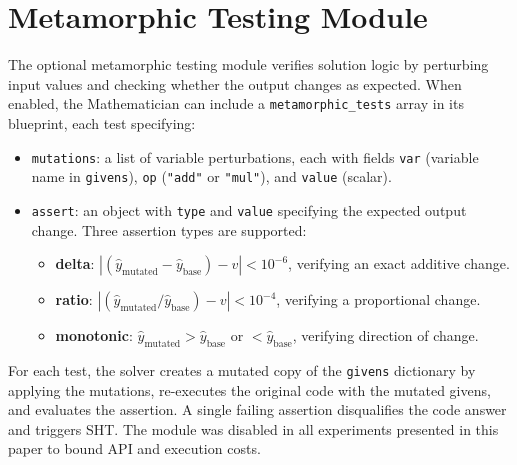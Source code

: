 \documentclass[11pt,a4paper]{article}
\begin{document}
\section{Metamorphic Testing Module}
\label{app:metamorphic}
The optional metamorphic testing module verifies solution logic by perturbing input values and checking whether the output changes as expected.
When enabled, the Mathematician can include a \texttt{metamorphic\_tests} array in its blueprint, each test specifying:
\begin{itemize}[leftmargin=*,itemsep=2pt]
    \item \texttt{mutations}: a list of variable perturbations, each with fields \texttt{var} (variable name in \texttt{givens}), \texttt{op} (\texttt{"add"} or \texttt{"mul"}), and \texttt{value} (scalar).
    \item \texttt{assert}: an object with \texttt{type} and \texttt{value} specifying the expected output change.
    Three assertion types are supported:
    \begin{itemize}[leftmargin=2em,itemsep=0pt]
        \item \textbf{delta}: $|(\hat{y}_\text{mutated} - \hat{y}_\text{base}) - v| < 10^{-6}$, verifying an exact additive change.
        \item \textbf{ratio}: $|(\hat{y}_\text{mutated} / \hat{y}_\text{base}) - v| < 10^{-4}$, verifying a proportional change.
        \item \textbf{monotonic}: $\hat{y}_\text{mutated} > \hat{y}_\text{base}$ or $< \hat{y}_\text{base}$, verifying direction of change.
    \end{itemize}
\end{itemize}
For each test, the solver creates a mutated copy of the \texttt{givens} dictionary by applying the mutations, re-executes the original code with the mutated givens, and evaluates the assertion.
A single failing assertion disqualifies the code answer and triggers SHT.
The module was disabled in all experiments presented in this paper to bound API and execution costs.
\end{document}
